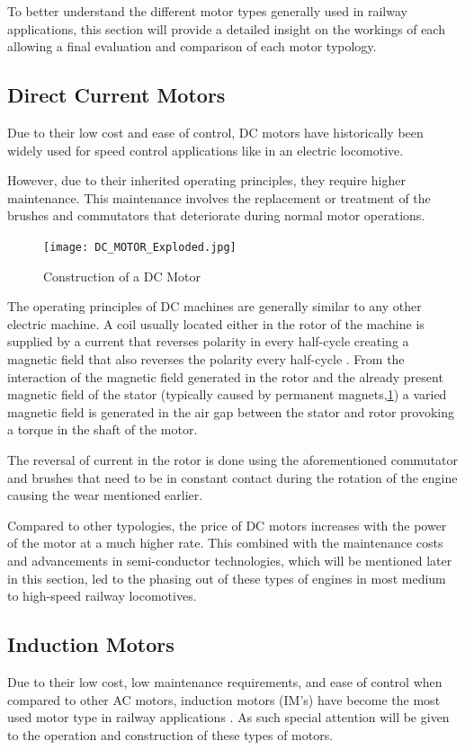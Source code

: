 To better understand the different motor types generally used in railway applications, this section will provide a detailed insight on the workings of each allowing a final evaluation and comparison of each motor typology.  
\subsection{Direct Current Motors}

Due to their low cost and ease of control, DC motors have historically been widely used for speed control applications like in an electric locomotive. 

However, due to their inherited operating principles, they require higher maintenance. This maintenance involves the replacement or treatment of the brushes and commutators that deteriorate during normal motor operations. 

\begin{figure}[ht]
    \centering
    \texttt{[image: DC\_MOTOR\_Exploded.jpg]}
    \caption{Construction of a DC Motor \cite{Mohan}}
    \label{fig:DC_Motor}
\end{figure}

The operating principles of DC machines are generally similar to any other electric machine. A coil usually located either in the rotor of the machine is supplied by a current that reverses polarity in every half-cycle creating a magnetic field that also reverses the polarity every half-cycle \cite{Mohan}. From the interaction of the magnetic field generated in the rotor and the already present magnetic field of the stator (typically caused by permanent magnets,\ref{fig:DC_Motor}) a varied magnetic field is generated in the air gap between the stator and rotor provoking a torque in the shaft of the motor. 

The reversal of current in the rotor is done using the aforementioned commutator and brushes that need to be in constant contact during the rotation of the engine causing the wear mentioned earlier.

Compared to other typologies, the price of DC motors increases with the power of the motor at a much higher rate. This combined with the maintenance costs and advancements in semi-conductor technologies, which will be mentioned later in this section, led to the phasing out of these types of engines in most medium to high-speed railway locomotives.

\subsection{Induction Motors}
Due to their low cost, low maintenance requirements, and ease of control when compared to other AC motors, induction motors (IM's) have become the most used motor type in railway applications \cite{MainSOTA}. As such special attention will be given to the operation and construction of these types of motors. 

